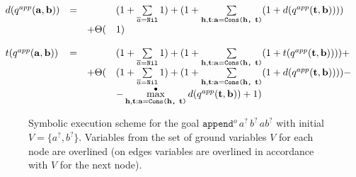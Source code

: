\[
\begin{array}{lcll}
d(q^{app}(\mathbf{a}, \mathbf{b})) & = & & (1 + \sum\limits_{\overline{a} = \texttt{Nil}} 1) + (1 + \sum\limits_{\mathbf{h}, \mathbf{t}: \mathbf{a} = \texttt{Cons($\mathbf{h}$, $\mathbf{t}$)}} (1 + d(q^{app}(\mathbf{t}, \mathbf{b})))) \\
& & + \Theta( & 1) \\
\\
t(q^{app}(\mathbf{a}, \mathbf{b})) & = & & (1 + \sum\limits_{\overline{a} = \texttt{Nil}} 1) + (1 + \sum\limits_{\mathbf{h}, \mathbf{t}: \mathbf{a} = \texttt{Cons($\mathbf{h}$, $\mathbf{t}$)}} (1 + t(q^{app}(\mathbf{t}, \mathbf{b})))) + \\
& & + \Theta( & (1 + \sum\limits_{\overline{a} = \texttt{Nil}} 1) + (1 + \sum\limits_{\mathbf{h}, \mathbf{t}: \mathbf{a} = \texttt{Cons($\mathbf{h}$, $\mathbf{t}$)}} (1 + d(q^{app}(\mathbf{t}, \mathbf{b})))) - \\
& & &  - \max^{\bullet}\limits_{\mathbf{h}, \mathbf{t}: \mathbf{a} = \texttt{Cons($\mathbf{h}$, $\mathbf{t}$)}} d(q^{app}(\mathbf{t}, \mathbf{b})) + 1) 
\end{array}
\]

\begin{figure}[t]
\begin{center}
\end{center}

\caption{Symbolic execution scheme for the goal $\texttt{append$^o$} \, a^? \, b^? \, ab^?$ with initial $V = \{ a^?, b^? \}$. Variables from the set of ground variables $V$ for each node are overlined (on edges variables are overlined in accordance with $V$ for the next node). }
\label{fig:appendo_scheme}
\end{figure}

